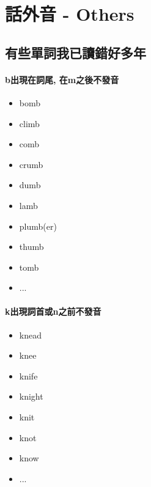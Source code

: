 \chapter{話外音 - Others}
\section{有些單詞我已讀錯好多年}
\subsubsection{b出現在詞尾, 在m之後不發音}
\begin{multicols}{3}
\begin{itemize}
  \itemsep0em
  \item bomb
  \item climb
  \item comb
  \item crumb
  \item dumb
  \item lamb
  \item plumb(er)
  \item thumb
  \item tomb
  \item ...
\end{itemize}
\end{multicols}

\subsubsection{k出現詞首或n之前不發音}
\begin{multicols}{3}
\begin{itemize}
  \itemsep0em
  \item knead
  \item knee
  \item knife
  \item knight
  \item knit
  \item knot
  \item know
  \item ...
\end{itemize}
\end{multicols}

